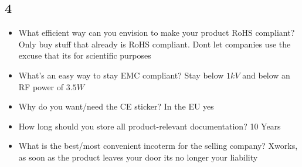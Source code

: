 \documentclass{alex_summary}
\begin{document}
	\subsection*{4}
	\begin{itemize}
		\item What efficient way can you envision to make your product RoHS compliant?
		Only buy stuff that already is RoHS compliant. Dont let companies use the excuse that its for scientific purposes
		\item What’s an easy way to stay EMC compliant?
		Stay below \( 1kV \) and below an RF power of \( 3.5 \unit{W} \)
		\item Why do you want/need the CE sticker?
		In the EU yes
		\item How long should you store all product-relevant documentation?
		10 Years
		\item What is the best/most convenient incoterm for the selling company?
		Xworks, as soon as the product leaves your door its no longer your liability
	\end{itemize}
\end{document}
